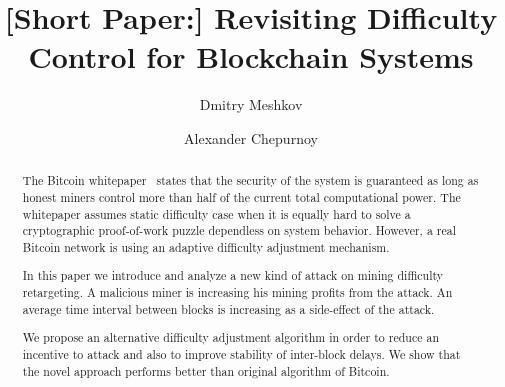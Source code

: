 \documentclass[]{llncs}
\begin{document}



\title{[Short Paper:] Revisiting Difficulty Control for Blockchain Systems}



\author{Dmitry Meshkov \and Alexander Chepurnoy}


\maketitle

\begin{abstract}

The Bitcoin whitepaper~\cite{Nakamoto2008} states that the security of the system is guaranteed as long as honest miners control more than half of the current total computational power. The whitepaper assumes static difficulty case when it is equally hard to solve a cryptographic proof-of-work puzzle dependless on system behavior. However, a real Bitcoin network is using an adaptive difficulty adjustment mechanism.  

In this paper we introduce and analyze a new kind of attack on mining difficulty retargeting. A malicious miner is increasing his mining profits from the attack. An average time interval between blocks is increasing as a side-effect of the attack.

We propose an alternative difficulty adjustment algorithm in order to reduce an incentive to attack and also to improve stability of inter-block delays. We show that the novel approach performs better than original algorithm of Bitcoin.
	
\end{abstract}
\end{document}
